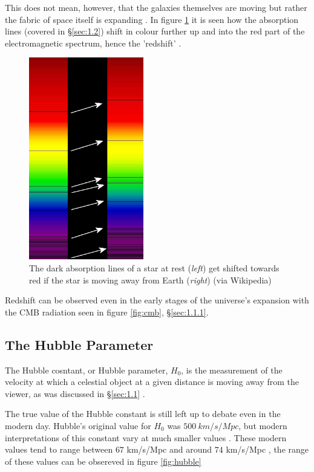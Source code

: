\documentclass[12pt]{article}
\begin{document}
This does not mean, however, that the galaxies themselves are moving but rather the fabric of space itself is expanding
\cite{esaredshift}.
In figure \ref{fig:redshift} it is seen how the absorption lines (covered in §\ref{sec:1.2}) shift in colour further up and into the red part
of the electromagnetic spectrum, hence the 'redshift'
\cite{earthskyredshift}.

\begin{figure}[H]
    \centering
    \includegraphics[width=5cm]{Redshift.png}
    \caption{\centering \footnotesize{The dark absorption lines of a star at rest (\textit{left}) get shifted towards red if the star is moving away from Earth (\textit{right}) \protect\cite{earthskyredshift} (via Wikipedia)}}
    \label{fig:redshift}
\end{figure}

Redshift can be observed even in the early stages of the universe's expansion with the CMB radiation seen in figure \ref{fig:cmb}, §\ref{sec:1.1.1}.

\vspace{1cm}

\subsection{The Hubble Parameter} \label{sec:1.3}

The Hubble cosntant, or Hubble parameter, $H_0$, is the measurement of the velocity at which a celestial object at a given distance is moving away from the viewer,
as was discussed in §\ref{sec:1.1}
\cite{brithubble,chicagohubble}.

The true value of the Hubble constant is still left up to debate even in the modern day. Hubble's original value for $H_0$ was $500 \: km/s/Mpc$,
but modern interpretations of this constant vary at much smaller values
\cite{brithubble,chicagohubble}.
These modern values tend to range between $67$ km/s/Mpc and around $74$ km/s/Mpc
\cite{chicagohubble,nasahubble}, the range of these values can be obsereved in figure \ref{fig:hubble}
\end{document}
